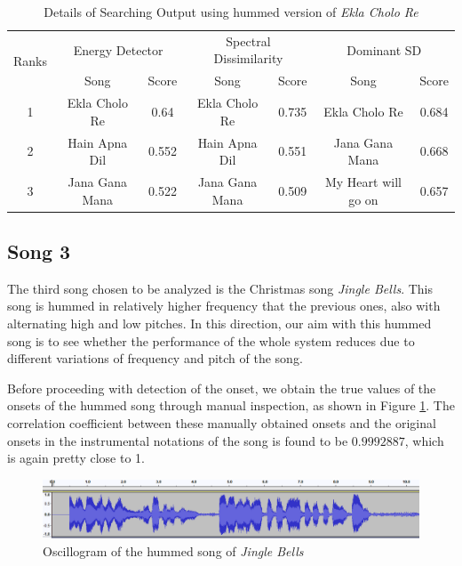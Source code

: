 \documentclass[10pt]{article}
\begin{document}
\begin{table}
\centering
\caption{Details of Searching Output using hummed version of \textit{Ekla Cholo Re}}
\label{tbl:search_song2}
\begin{tabular}{|c|c|c|c|c|c|c|}
\hline
\multirow{2}{*}{Ranks} & \multicolumn{2}{c|}{Energy Detector} & \multicolumn{2}{c|}{Spectral Dissimilarity} & \multicolumn{2}{c|}{Dominant SD} \\ \cline{2-7} 
                       & Song                  & Score        & Song                      & Score           & Song                   & Score     \\ \hline
1                      & Ekla Cholo Re         & 0.64         & Ekla Cholo Re             & 0.735           & Ekla Cholo Re          & 0.684     \\ \hline
2                      & Hain Apna Dil         & 0.552        & Hain Apna Dil             & 0.551           & Jana Gana Mana         & 0.668     \\ \hline
3                      & Jana Gana Mana        & 0.522        & Jana Gana Mana            & 0.509           & My Heart will go on    & 0.657     \\ \hline
\end{tabular}
\end{table}


\subsection{Song 3}
\qquad The third song chosen to be analyzed is the Christmas song \textit{Jingle Bells}. This song is hummed in relatively higher frequency that the previous ones, also with alternating high and low pitches. In this direction, our aim with this hummed song is to see whether the performance of the whole system reduces due to different variations of frequency and pitch of the song.

Before proceeding with detection of the onset, we obtain the true values of the onsets of the hummed song through manual inspection, as shown in Figure \ref{fig:oscillo_song3}. The correlation coefficient between these manually obtained onsets and the original onsets in the instrumental notations of the song is found to be $0.9992887$, which is again pretty close to 1.

\begin{figure}
    \centering
    \includegraphics[width = \textwidth]{oscillogram_jingle_bells.png}
    \caption{Oscillogram of the hummed song of \textit{Jingle Bells}}
    \label{fig:oscillo_song3}
\end{figure}
\end{document}
